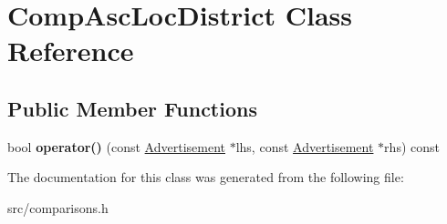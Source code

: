 \hypertarget{class_comp_asc_loc_district}{}\section{Comp\+Asc\+Loc\+District Class Reference}
\label{class_comp_asc_loc_district}
\subsection*{Public Member Functions}
\begin{DoxyCompactItemize}
\item 
\hypertarget{class_comp_asc_loc_district_aa9c6963799c69496bdab6a352da139eb}{}bool {\bfseries operator()} (const \hyperlink{class_advertisement}{Advertisement} $\ast$lhs, const \hyperlink{class_advertisement}{Advertisement} $\ast$rhs) const \label{class_comp_asc_loc_district_aa9c6963799c69496bdab6a352da139eb}

\end{DoxyCompactItemize}


The documentation for this class was generated from the following file\+:\begin{DoxyCompactItemize}
\item 
src/comparisons.\+h\end{DoxyCompactItemize}
